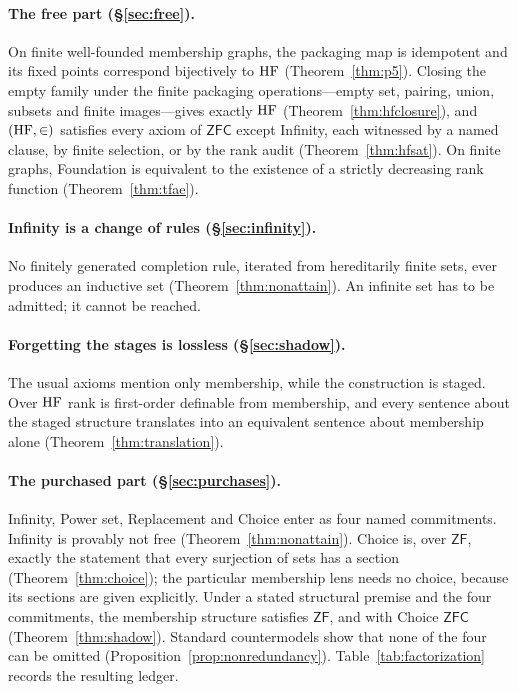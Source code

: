 \paragraph{The free part (\S\ref{sec:free}).} On finite well-founded membership graphs, the
packaging map is idempotent and its fixed points correspond bijectively to $\mathrm{HF}$
(Theorem~\ref{thm:p5}). Closing the empty family under the finite packaging operations---empty
set, pairing, union, subsets and finite images---gives exactly $\mathrm{HF}$ (Theorem~\ref{thm:hfclosure}),
and $(\mathrm{HF},\in)$ satisfies every axiom of $\mathsf{ZFC}$ except Infinity, each witnessed by a
named clause, by finite selection, or by the rank audit (Theorem~\ref{thm:hfsat}). On finite graphs, Foundation is
equivalent to the existence of a strictly decreasing rank function (Theorem~\ref{thm:tfae}).

\paragraph{Infinity is a change of rules (\S\ref{sec:infinity}).} No finitely generated
completion rule, iterated from hereditarily finite sets, ever produces an inductive set
(Theorem~\ref{thm:nonattain}). An infinite set has to be admitted; it cannot be reached.

\paragraph{Forgetting the stages is lossless (\S\ref{sec:shadow}).} The usual axioms mention
only membership, while the construction is staged. Over $\mathrm{HF}$ rank is first-order definable from
membership, and every sentence about the staged structure translates into an equivalent sentence
about membership alone (Theorem~\ref{thm:translation}).

\paragraph{The purchased part (\S\ref{sec:purchases}).} Infinity, Power set, Replacement and
Choice enter as four named commitments. Infinity is provably not free
(Theorem~\ref{thm:nonattain}). Choice is, over $\mathsf{ZF}$, exactly the statement that every
surjection of sets has a section (Theorem~\ref{thm:choice}); the particular membership lens needs
no choice, because its sections are given explicitly. Under a stated structural premise and the
four commitments, the membership structure satisfies $\mathsf{ZF}$, and with Choice $\mathsf{ZFC}$
(Theorem~\ref{thm:shadow}). Standard countermodels show that none of the four can be omitted
(Proposition~\ref{prop:nonredundancy}). Table~\ref{tab:factorization} records the resulting
ledger.

